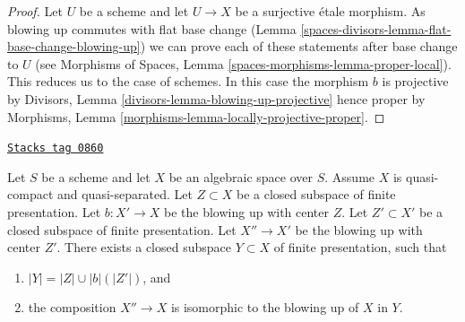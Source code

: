 \begin{proof}
Let $U$ be a scheme and let $U \to X$ be a surjective \'etale morphism.
As blowing up commutes with flat base change
(Lemma \ref{spaces-divisors-lemma-flat-base-change-blowing-up})
we can prove each of these statements after base change to $U$
(see Morphisms of Spaces, Lemma
\ref{spaces-morphisms-lemma-proper-local}).
This reduces us to the case of schemes.
In this case the morphism $b$ is projective by
Divisors, Lemma \ref{divisors-lemma-blowing-up-projective}
hence proper by
Morphisms, Lemma \ref{morphisms-lemma-locally-projective-proper}.
\end{proof}

\begin{lemma}
\label{spaces-divisors-lemma-composition-finite-type-blowups}
\href{https://stacks.math.columbia.edu/tag/0860}{\texttt{Stacks tag 0860}}

Let $S$ be a scheme and let $X$ be an algebraic space over $S$.
Assume $X$ is quasi-compact and quasi-separated.
Let $Z \subset X$ be a closed subspace of finite presentation.
Let $b : X' \to X$ be the blowing up with center $Z$.
Let $Z' \subset X'$ be a closed subspace of finite presentation.
Let $X'' \to X'$ be the blowing up with center $Z'$.
There exists a closed subspace $Y \subset X$ of finite presentation,
such that
\begin{enumerate}
\item $|Y| = |Z| \cup |b|(|Z'|)$, and
\item the composition $X'' \to X$ is isomorphic to the blowing up
of $X$ in $Y$.
\end{enumerate}
\end{lemma}

